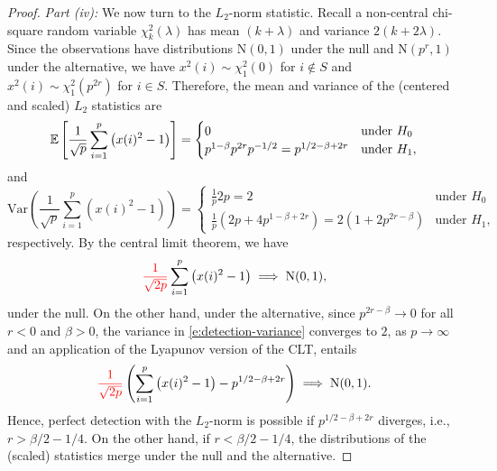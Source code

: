 \begin{proof}
{\em Part {\rm (iv)}:}  We now turn to the $L_2$-norm statistic.
Recall a non-central chi-square random variable $\chi^2_k(\lambda)$ has mean $(k+\lambda)$ and variance $2(k+2\lambda)$.
Since the observations have distributions $\mathrm{N}(0,1)$ under the null and $\mathrm{N}(p^r,1)$ under the alternative, we have $x^2(i)\sim \chi^2_1(0)$ for $i\not\in S$ and $x^2(i)\sim \chi^2_1(p^{2r})$ for $i\in S$.
Therefore, the mean and variance of the (centered and scaled) $L_2$ statistics are
\begin{equation}
    {\mathbb E}\left[\frac{1}{\sqrt{p}}\sum_{i=1}^p \left(x(i)^2-1\right)\right] = 
    \begin{cases}
    0 & \text{under } H_0\\
    p^{1-\beta}p^{2r}p^{-1/2} = p^{1/2-\beta+2r} & \text{under } H_1,
    \end{cases}
\end{equation}
and 
\begin{equation}\label{e:detection-variance}
    \mathrm{Var}\left(\frac{1}{\sqrt{p}}\sum_{i=1}^p \left(x(i)^2-1\right)\right) = 
    \begin{cases}
    \frac{1}{p}2p = 2 & \text{under } H_0\\
    \frac{1}{p}\left(2p+4p^{1-\beta+2r}\right) = 2(1+ 2p^{2r-\beta}) & \text{under } H_1,
    \end{cases}
\end{equation}
respectively.
By the central limit theorem, we have
\begin{equation}
    {\color{red}\frac{1}{\sqrt{2p}}}\sum_{i=1}^p \left(x(i)^2-1\right) \implies \mathrm{N}(0,1),  
\end{equation}
under the null.    On the other hand, under the alternative, since $p^{2r-\beta}\to0$ for all $r<0$ and $\beta>0$, 
 the variance in \eqref{e:detection-variance} converges to $2$, as $p\to\infty$ and an application of the Lyapunov version of 
 the CLT, entails
 \begin{equation}
    {\color{red} \frac{1}{\sqrt{2p}}}\left(\sum_{i=1}^p \left(x(i)^2-1\right) - p^{1/2-\beta+2r}\right) \implies \mathrm{N}(0,1).
\end{equation}
Hence, perfect detection with the $L_2$-norm is possible if $p^{1/2-\beta+2r}$ diverges, i.e., $r>\beta/2-1/4$.
On the other hand, if $r<\beta/2-1/4$, the distributions of the (scaled) statistics merge under the null and the alternative. %


\end{proof}
